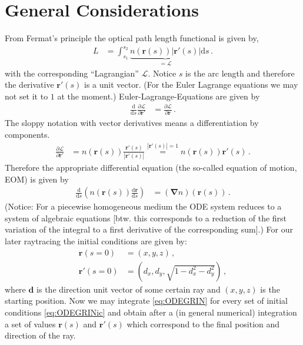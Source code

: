 \documentclass[12pt,a4paper,twoside,openright,BCOR10mm,headsepline,titlepage,abstracton,chapterprefix,final]{scrreprt}
\newcommand\Vector[1]{{\mathbf{#1}}}
\begin{document}
\section{General Considerations}
From Fermat's principle the optical path length functional is given by,
\begin{align}
 L &= \int_{s_1}^{s_2} \underbrace{n(\Vector{r}(s)) |\Vector{r}'(s)|}_{=\mathcal{L}} \text{d}s\,.\label{eq:fermatiso}
\end{align}
with the corresponding ``Lagrangian'' $\mathcal{L}$.
Notice $s$ is the arc length and therefore the derivative $\Vector{r}'(s)$ is a unit vector. (For the Euler Lagrange
equations we may not set it to $1$ at the moment.)
Euler-Lagrange-Equations are given by
\begin{align}
 \frac{\text{d}}{\text{d}s} \frac{\partial \mathcal{L}}{\partial \Vector{r}'} &= \frac{\partial \mathcal{L}}{\partial \Vector{r}}\,.
\end{align}
The sloppy notation with vector derivatives means a differentiation by components.
\begin{align}
 \frac{\partial \mathcal{L}}{\partial \Vector{r}'} &= n(\Vector{r}(s)) \frac{\Vector{r}'(s)}{|\Vector{r}'(s)|} \stackrel{|\Vector{r}'(s)|=1}{=} n(\Vector{r}(s))\Vector{r}'(s)\,.
\end{align}
Therefore the appropriate differential equation (the so-called equation of motion, EOM) is given by
\begin{align}
 \frac{\text{d}}{\text{d}s} \left(n(\Vector{r}(s)) \frac{\text{d}\Vector{r}}{\text{d}s}\right) &= (\Vector{\nabla} n)(\Vector{r}(s)) \label{eq:ODEGRIN}\,.
\end{align}
(Notice: For a piecewise homogeneous medium the ODE system reduces to a system of algebraic equations 
[btw. this corresponds to a reduction of the
first variation of the integral to a first derivative of the corresponding sum].) 
For our later raytracing the initial conditions are given by:
\begin{subequations}
\label{eq:ODEGRINic}
\begin{align}
 \Vector{r}(s=0) &= (x,y,z)\,,\\
 \Vector{r}'(s=0) &= (d_x, d_y, \sqrt{1-d_x^2-d_y^2})\,,
\end{align}
\end{subequations}
where $\Vector{d}$ is the direction unit vector of some certain ray and $(x,y,z)$ is the starting position.
Now we may integrate \eqref{eq:ODEGRIN} for every set of initial conditions \eqref{eq:ODEGRINic}
and obtain after a (in general numerical) integration a set of values $\Vector{r}(s)$ and $\Vector{r}'(s)$
which correspond to the final position and direction of the ray.
\end{document}

